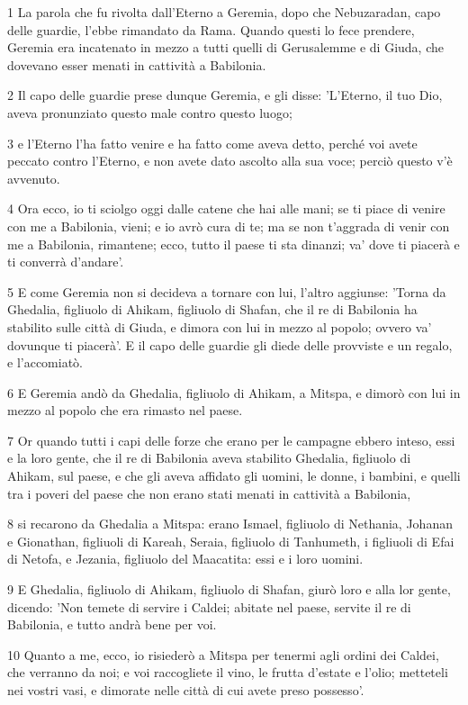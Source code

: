 \par 1 La parola che fu rivolta dall'Eterno a Geremia, dopo che Nebuzaradan, capo delle guardie, l'ebbe rimandato da Rama. Quando questi lo fece prendere, Geremia era incatenato in mezzo a tutti quelli di Gerusalemme e di Giuda, che dovevano esser menati in cattività a Babilonia.
\par 2 Il capo delle guardie prese dunque Geremia, e gli disse: 'L'Eterno, il tuo Dio, aveva pronunziato questo male contro questo luogo;
\par 3 e l'Eterno l'ha fatto venire e ha fatto come aveva detto, perché voi avete peccato contro l'Eterno, e non avete dato ascolto alla sua voce; perciò questo v'è avvenuto.
\par 4 Ora ecco, io ti sciolgo oggi dalle catene che hai alle mani; se ti piace di venire con me a Babilonia, vieni; e io avrò cura di te; ma se non t'aggrada di venir con me a Babilonia, rimantene; ecco, tutto il paese ti sta dinanzi; va' dove ti piacerà e ti converrà d'andare'.
\par 5 E come Geremia non si decideva a tornare con lui, l'altro aggiunse: 'Torna da Ghedalia, figliuolo di Ahikam, figliuolo di Shafan, che il re di Babilonia ha stabilito sulle città di Giuda, e dimora con lui in mezzo al popolo; ovvero va' dovunque ti piacerà'. E il capo delle guardie gli diede delle provviste e un regalo, e l'accomiatò.
\par 6 E Geremia andò da Ghedalia, figliuolo di Ahikam, a Mitspa, e dimorò con lui in mezzo al popolo che era rimasto nel paese.
\par 7 Or quando tutti i capi delle forze che erano per le campagne ebbero inteso, essi e la loro gente, che il re di Babilonia aveva stabilito Ghedalia, figliuolo di Ahikam, sul paese, e che gli aveva affidato gli uomini, le donne, i bambini, e quelli tra i poveri del paese che non erano stati menati in cattività a Babilonia,
\par 8 si recarono da Ghedalia a Mitspa: erano Ismael, figliuolo di Nethania, Johanan e Gionathan, figliuoli di Kareah, Seraia, figliuolo di Tanhumeth, i figliuoli di Efai di Netofa, e Jezania, figliuolo del Maacatita: essi e i loro uomini.
\par 9 E Ghedalia, figliuolo di Ahikam, figliuolo di Shafan, giurò loro e alla lor gente, dicendo: 'Non temete di servire i Caldei; abitate nel paese, servite il re di Babilonia, e tutto andrà bene per voi.
\par 10 Quanto a me, ecco, io risiederò a Mitspa per tenermi agli ordini dei Caldei, che verranno da noi; e voi raccogliete il vino, le frutta d'estate e l'olio; metteteli nei vostri vasi, e dimorate nelle città di cui avete preso possesso'.

